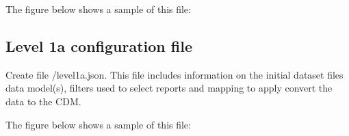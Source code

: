\documentclass[letterpaper,10pt,english]{sphinxmanual}
\begin{document}
The figure below shows a sample of this file:

\begin{sphinxVerbatim}[commandchars=\\\{\}]
\end{sphinxVerbatim}


\subsection{Level 1a configuration file}
\label{\detokenize{index:level-1a-configuration-file}}\label{\detokenize{index:level1a-config-file}}
Create file /level1a.json. This file includes information on
the initial dataset files data model(s), filters used to select reports and
mapping to apply convert the data to the CDM.

The figure below shows a sample of this file:
\end{document}
